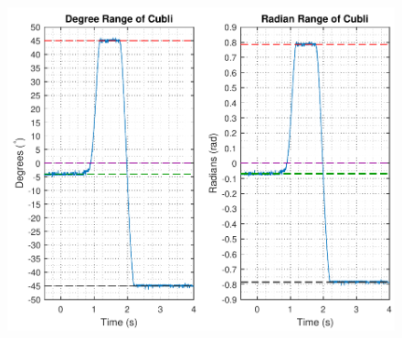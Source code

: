 \begin{minipage}{\linewidth}
\begin{minipage}{0.45\linewidth}
\begin{figure}[H]
  			\includegraphics[scale=.5]{figures/PotentiometerResolutionDegRad}
  			\centering
  			\captionsetup{justification=centering}
  			\vspace{-.5cm}
  			\label{PotentiometerResolutionRadDeg}
  		\end{figure}\vspace{-5mm}
  	\end{minipage}
\end{minipage}

